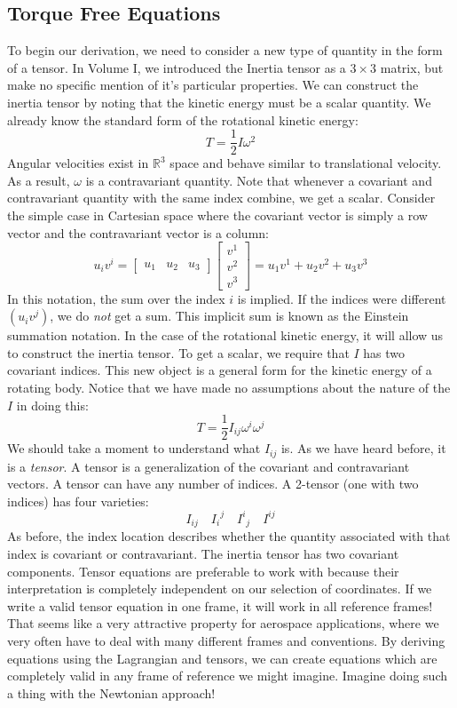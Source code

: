 \subsection{Torque Free Equations}
To begin our derivation, we need to consider a new type of quantity in the form of a tensor. In Volume I, we introduced the Inertia tensor as a $3\times3$ matrix, but make no specific mention of it's particular properties. We can construct the inertia tensor by noting that the kinetic energy must be a scalar quantity. We already know the standard form of the rotational kinetic energy:
$$T=\frac{1}{2}I\omega^2$$
Angular velocities exist in $\mathbb{R}^3$ space and behave similar to translational velocity. As a result, $\omega$ is a contravariant quantity. Note that whenever a covariant and contravariant quantity with the same index combine, we get a scalar. Consider the simple case in Cartesian space where the covariant vector is simply a row vector and the contravariant vector is a column:
$$u_iv^i=\begin{bmatrix}
    u_1&u_2&u_3
\end{bmatrix}\begin{bmatrix}
    v^1\\v^2\\v^3
\end{bmatrix}=u_1v^1+u_2v^2+u_3v^3$$
In this notation, the sum over the index $i$ is implied. If the indices were different $(u_iv^j)$, we do \textit{not} get a sum. This implicit sum is known as the Einstein summation notation. In the case of the rotational kinetic energy, it will allow us to construct the inertia tensor. To get a scalar, we require that $I$ has two covariant indices. This new object is a general form for the kinetic energy of a rotating body. Notice that we have made no assumptions about the nature of the $I$ in doing this:
$$T=\frac{1}{2}I_{ij}\omega^i\omega^j$$
We should take a moment to understand what $I_{ij}$ is. As we have heard before, it is a \textit{tensor}. A tensor is a generalization of the covariant and contravariant vectors. A tensor can have any number of indices. A 2-tensor (one with two indices) has four varieties:
$$I_{ij}\quad {I_i}^j\quad {I^i}_j\quad I^{ij}$$
As before, the index location describes whether the quantity associated with that index is covariant or contravariant. The inertia tensor has two covariant components. Tensor equations are preferable to work with because their interpretation is completely independent on our selection of coordinates. If we write a valid tensor equation in one frame, it will work in all reference frames! That seems like a very attractive property for aerospace applications, where we very often have to deal with many different frames and conventions. By deriving equations using the \gls{Lagrangian} and tensors, we can create equations which are completely valid in any frame of reference we might imagine. Imagine doing such a thing with the Newtonian approach! 

